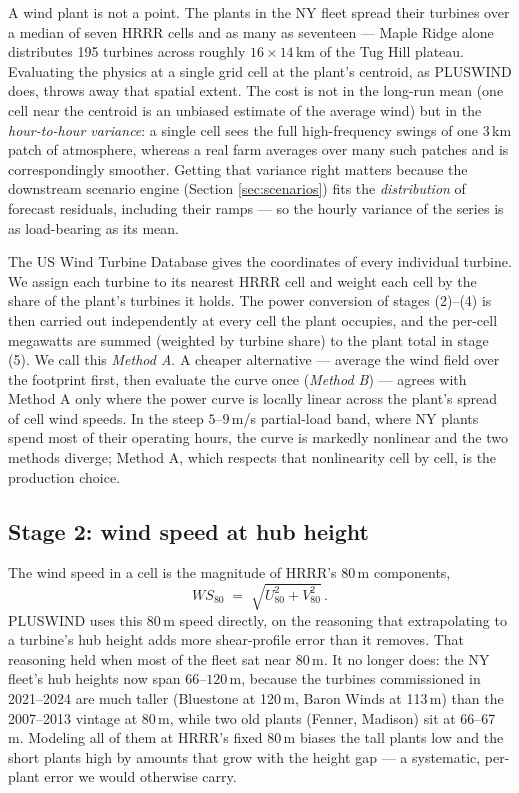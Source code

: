 \documentclass[11pt]{article}
\newcommand{\term}[1]{\emph{#1}}
\begin{document}
A wind plant is not a point. The plants in the NY fleet spread their
turbines over a median of seven HRRR cells and as many as seventeen ---
Maple Ridge alone distributes 195 turbines across roughly $16\times14$\,km
of the Tug Hill plateau. Evaluating the physics at a single grid cell at
the plant's centroid, as PLUSWIND does, throws away that spatial extent.
The cost is not in the long-run mean (one cell near the centroid is an
unbiased estimate of the average wind) but in the \emph{hour-to-hour
variance}: a single cell sees the full high-frequency swings of one
3\,km patch of atmosphere, whereas a real farm averages over many such
patches and is correspondingly smoother. Getting that variance right
matters because the downstream scenario engine (Section
\ref{sec:scenarios}) fits the \emph{distribution} of forecast residuals,
including their ramps --- so the hourly variance of the series is as
load-bearing as its mean.

The US Wind Turbine Database gives the coordinates of every individual
turbine. We assign each turbine to its nearest HRRR cell and weight each
cell by the share of the plant's turbines it holds. The power conversion
of stages (2)--(4) is then carried out independently at every cell the
plant occupies, and the per-cell megawatts are summed (weighted by
turbine share) to the plant total in stage (5). We call this
\term{Method A}. A cheaper alternative --- average the wind field over
the footprint first, then evaluate the curve once (\term{Method B}) ---
agrees with Method A only where the power curve is locally linear across
the plant's spread of cell wind speeds. In the steep $5$--$9$\,m/s
partial-load band, where NY plants spend most of their operating hours,
the curve is markedly nonlinear and the two methods diverge; Method A,
which respects that nonlinearity cell by cell, is the production choice.

\subsection{Stage 2: wind speed at hub height}
\label{sec:hubshear}

The wind speed in a cell is the magnitude of HRRR's 80\,m components,
\begin{equation}
  W\!S_{80} \;=\; \sqrt{U_{80}^2 + V_{80}^2}\,. \label{eq:ws}
\end{equation}
PLUSWIND uses this 80\,m speed directly, on the reasoning that
extrapolating to a turbine's hub height adds more shear-profile error
than it removes. That reasoning held when most of the fleet sat near
80\,m. It no longer does: the NY fleet's hub heights now span
$66$--$120$\,m, because the turbines commissioned in 2021--2024 are much
taller (Bluestone at 120\,m, Baron Winds at 113\,m) than the
2007--2013 vintage at 80\,m, while two old plants (Fenner, Madison) sit
at 66--67\,m. Modeling all of them at HRRR's fixed 80\,m biases the tall
plants low and the short plants high by amounts that grow with the
height gap --- a systematic, per-plant error we would otherwise carry.
\end{document}
